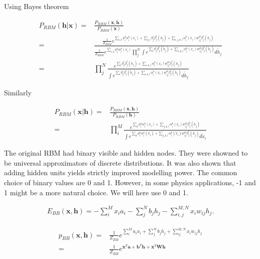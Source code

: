 \documentclass[%
oneside,                 %
final,                   %
10pt]{article}
\begin{document}
Using Bayes theorem

\begin{align}
	P_{RBM} (\bm{h}|\bm{x}) =& \frac{P_{RBM} (\bm{x}, \bm{h})}{P_{RBM} (\bm{x})} \nonumber \\
	=& \frac{\frac{1}{Z_{RBM}} e^{\sum_{i, k} a_i^k \alpha_i^k (x_i)
	+ \sum_{j, l} b_j^l \beta_j^l (h_j) 
	+ \sum_{i,j,k,l} \alpha_i^k (x_i) w_{ij}^{kl} \beta_j^l (h_j)}}
	{\frac{1}{Z_{RBM}} e^{\sum_{i, k} a_i^k \alpha_i^k (x_i)}
	\prod_j^N \int e^{\sum_l b_j^l \beta_j^l (\tilde{h}_j) + \sum_{i,k,l} \alpha_i^k (x_i) w_{ij}^{kl} \beta_j^l (\tilde{h}_j)}  d\tilde{h}_j} \nonumber \\
	=& \prod_j^N \frac{e^{\sum_l b_j^l \beta_j^l (h_j) + \sum_{i,k,l} \alpha_i^k (x_i) w_{ij}^{kl} \beta_j^l (h_j)} }
	{\int e^{\sum_l b_j^l \beta_j^l (\tilde{h}_j) + \sum_{i,k,l} \alpha_i^k (x_i) w_{ij}^{kl} \beta_j^l (\tilde{h}_j)}  d\tilde{h}_j}
\end{align}

Similarly

\begin{align}
	P_{RBM} (\bm{x}|\bm{h}) =&  \frac{P_{RBM} (\bm{x}, \bm{h})}{P_{RBM} (\bm{h})} \nonumber \\
	=& \prod_i^M \frac{e^{\sum_k a_i^k \alpha_i^k (x_i)
	+ \sum_{j,k,l} \alpha_i^k (x_i) w_{ij}^{kl} \beta_j^l (h_j)}}
	{\int e^{\sum_k a_i^k \alpha_i^k (\tilde{x}_i)
	+ \sum_{j,k,l} \alpha_i^k (\tilde{x}_i) w_{ij}^{kl} \beta_j^l (h_j)} d\tilde{x}_i}
\end{align}




The original RBM had binary visible and hidden nodes. They were
showned to be universal approximators of discrete distributions.
It was also shown that adding hidden units yields
strictly improved modelling power. The common choice of binary values
are 0 and 1. However, in some physics applications, -1 and 1 might be
a more natural choice. We will here use 0 and 1.


\begin{align}
	E_{BB}(\bm{x}, \mathbf{h}) = - \sum_i^M x_i a_i- \sum_j^N b_j h_j - \sum_{i,j}^{M,N} x_i w_{ij} h_j.
\end{align}



\begin{align}
	p_{BB}(\bm{x}, \bm{h}) =& \frac{1}{Z_{BB}} e^{\sum_i^M a_i x_i + \sum_j^N b_j h_j + \sum_{ij}^{M,N} x_i w_{ij} h_j} \\
	=& \frac{1}{Z_{BB}} e^{\bm{x}^T \bm{a} + \bm{b}^T \bm{h} + \bm{x}^T \bm{W} \bm{h}}
\end{align}
\end{document}
